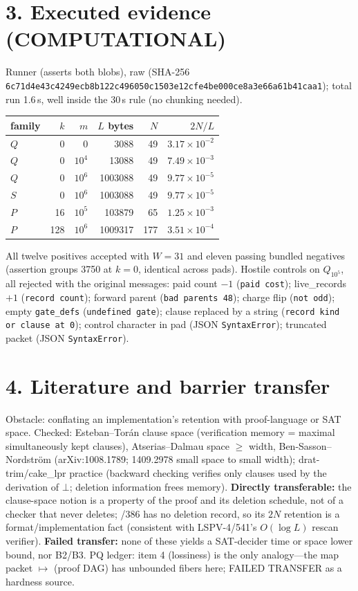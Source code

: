 \documentclass[11pt]{article}
\begin{document}
\section*{3. Executed evidence (COMPUTATIONAL)}
Runner  (asserts both blobs), raw  (SHA-256 \texttt{6c71d4e43c4249ecb8b122c496050c1503e12cfe4be000ce8a3e66a61b41caa1}); total run 1.6\,s, well inside the 30\,s rule (no chunking needed).
\begin{center}
\begin{tabular}{lrrrrr}
family & $k$ & $m$ & $L$ bytes & $N$ & $2N/L$\\\hline
$Q$ & 0 & 0 & 3088 & 49 & $3.17\times10^{-2}$\\
$Q$ & 0 & $10^4$ & 13088 & 49 & $7.49\times10^{-3}$\\
$Q$ & 0 & $10^6$ & 1003088 & 49 & $9.77\times10^{-5}$\\
$S$ & 0 & $10^6$ & 1003088 & 49 & $9.77\times10^{-5}$\\
$P$ & 16 & $10^5$ & 103879 & 65 & $1.25\times10^{-3}$\\
$P$ & 128 & $10^6$ & 1009317 & 177 & $3.51\times10^{-4}$
\end{tabular}
\end{center}
All twelve positives accepted with $W=31$ and eleven passing bundled negatives (assertion groups 3750 at $k=0$, identical across pads). Hostile controls on $Q_{10^5}$, all rejected with the original messages: paid count $-1$ (\texttt{paid cost}); live\_records $+1$ (\texttt{record count}); forward parent (\texttt{bad parents 48}); charge flip (\texttt{not odd}); empty \texttt{gate\_defs} (\texttt{undefined gate}); clause replaced by a string (\texttt{record kind or clause at 0}); control character in pad (JSON \texttt{SyntaxError}); truncated packet (JSON \texttt{SyntaxError}).

\section*{4. Literature and barrier transfer}
Obstacle: conflating an implementation's retention with proof-language or SAT space. Checked: Esteban--Tor\'an clause space (verification memory = maximal simultaneously kept clauses), Atserias--Dalmau space $\ge$ width, Ben-Sasson--Nordstr\"om (arXiv:1008.1789; 1409.2978 small space to small width); drat-trim/cake\_lpr practice (backward checking verifies only clauses used by the derivation of $\bot$; deletion information frees memory). \textbf{Directly transferable:} the clause-space notion is a property of the proof and its deletion schedule, not of a checker that never deletes; /386 has no deletion record, so its $2N$ retention is a format/implementation fact (consistent with LSPV-4/541's $O(\log L)$ rescan verifier). \textbf{Failed transfer:} none of these yields a SAT-decider time or space lower bound, nor B2/B3. PQ ledger: item 4 (lossiness) is the only analogy---the map packet $\mapsto$ (proof DAG) has unbounded fibers here; FAILED TRANSFER as a hardness source.
\end{document}
